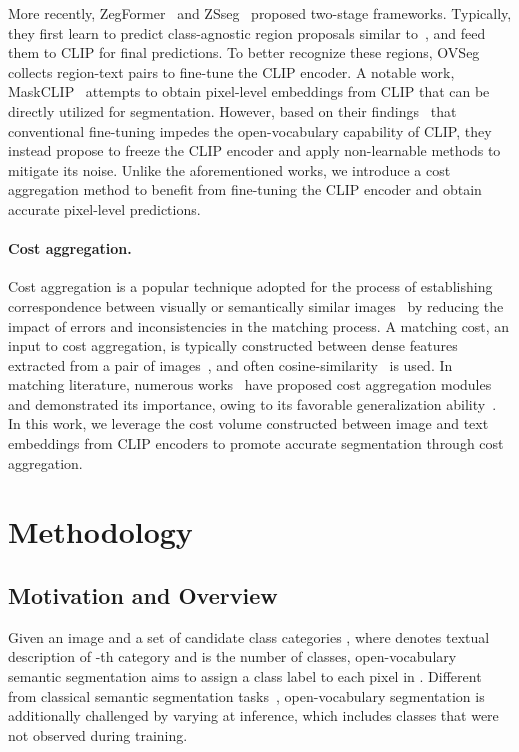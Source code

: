 \documentclass[10pt,twocolumn,letterpaper]{article}
\begin{document}
More recently, ZegFormer~\cite{ding2022decoupling} and ZSseg~\cite{xu2022simple} proposed two-stage frameworks. Typically, they first learn to predict class-agnostic region proposals similar to~\cite{ghiasi2022scaling}, and feed them to CLIP for final predictions. To better recognize these regions, OVSeg~\cite{liang2022open} collects region-text pairs to fine-tune the CLIP encoder. A notable work, MaskCLIP~\cite{zhou2022extract} attempts to obtain pixel-level embeddings from CLIP that can be directly utilized for segmentation. However, based on their findings~\cite{zhou2022extract} that conventional fine-tuning impedes the open-vocabulary capability of CLIP, they instead propose to freeze the CLIP encoder and apply non-learnable methods to mitigate its noise. Unlike the aforementioned works, we introduce a cost aggregation method to benefit from fine-tuning the CLIP encoder and obtain accurate pixel-level predictions.



\vspace{-10pt}
\paragraph{Cost aggregation.} Cost aggregation is a popular technique adopted for the process of establishing correspondence between visually or semantically similar images~\cite{kendall2017end,guo2019group,yang2019hierarchical,cho2021cats,hong2022cost} by reducing the impact of errors and inconsistencies in the matching process. A matching cost, an input to cost aggregation, is typically constructed between dense features extracted from a pair of images~\cite{rocco2017convolutional}, and often cosine-similarity~\cite{liu2022graftnet,rocco2017convolutional} is used. In matching literature, numerous works~\cite{kendall2017end, chang2018pyramid, guo2019group, yang2019hierarchical, song2021adastereo,hong2022neural,huang2022flowformer,cho2022cats++} have proposed cost aggregation modules and demonstrated its importance, owing to its favorable generalization ability~\cite{song2021adastereo,liu2022graftnet}. In this work, we leverage the cost volume constructed between image and text embeddings from CLIP encoders to promote accurate segmentation through cost aggregation.

 
\section{Methodology}
\subsection{Motivation and Overview}\label{motivation}
Given an image  and a set of candidate class categories , where  denotes textual description of -th category and  is the number of classes, open-vocabulary semantic segmentation aims to assign a class label to each pixel in . Different from classical semantic segmentation tasks~\cite{long2015fully, he2017mask, zhou2022rethinking, he2019adaptive, jin2021mining, yu2020context, yuan2020object}, open-vocabulary segmentation is additionally challenged by varying  at inference, which includes classes that were not observed during training. 
\end{document}
